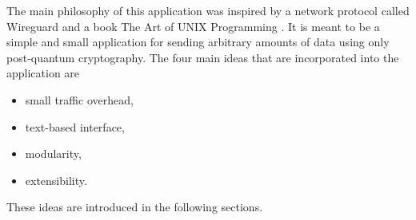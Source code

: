 The main philosophy of this application was inspired by a network protocol called Wireguard \cite{Donenfeld2020} and a book The Art of UNIX Programming \cite{Raymond2003}. It is meant to be a simple and small application for sending arbitrary amounts of data using only post-quantum cryptography. The four main ideas that are incorporated into the application are
\begin{itemize}
  \item small traffic overhead,
  \item text-based interface,
  \item modularity,
  \item extensibility.
\end{itemize}
These ideas are introduced in the following sections.
